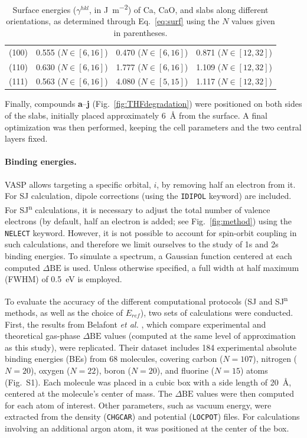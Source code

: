 \documentclass[journal=jpccck,manuscript=article]{achemso}
\def\dbe{\ensuremath{\Delta\text{BE}}}
\begin{document}
\begin{table}[!h]
	\centering
	\begin{tabular}{lccc}
		\toprule
		&	\ce{Ca^0} & \ce{CaO} &	\ce{CaH2} \\
		\midrule
		(100) & 0.555 ($N\in[6,16]$) & 0.470 ($N\in[6,16]$) & 0.871  ($N\in[12,32]$)\\
		(110) & 0.630  ($N\in[6,16]$)& 1.777  ($N\in[6,16]$)& 1.109 ($N\in[12,32]$)\\
		(111) & 0.563  ($N\in[6,16]$) & 4.080  ($N\in[5,15]$)  & 1.117   ($N\in[12,32]$) \\ 
		\bottomrule
	\end{tabular}
	\caption{Surface energies ($\gamma^{hkl}$, in \si{\joule\per\meter\squared}) of Ca, CaO, and  slabs along different orientations, as determined through Eq.~\eqref{eq:surf} using the $N$ values given in parentheses.}
	\label{tab:surf}
\end{table}

Finally, compounds \textbf{a}--\textbf{j} (Fig.~\ref{fig:THFdegradation}) were positioned on both sides of the slabs, initially placed approximately \SI{6}{\angstrom} from the surface. A final optimization was then performed, keeping the cell parameters and the two central layers fixed.

\paragraph{Binding energies.}  VASP allows targeting a specific orbital, $i$, by removing half an electron from it. For SJ calculation, dipole corrections (using the \texttt{IDIPOL} keyword) are included. For SJ\textsuperscript{n} calculations, it is necessary to adjust the total number of valence electrons (by default, half an electron is added; see Fig.~\ref{fig:method}) using the \texttt{NELECT} keyword. However, it is not possible to account for spin-orbit coupling in such calculations, and therefore we limit ourselves to the study of 1s and 2s binding energies. To simulate a spectrum, a Gaussian function centered at each computed \dbe{} is used. Unless otherwise specified, a full width at half maximum (FWHM) of \SI{0.5}{\electronvolt} is employed.

To evaluate the accuracy of the different computational protocols (SJ and SJ\textsuperscript{n} methods, as well as the choice of $E_{ref}$), two sets of calculations were conducted. First, the results from Belafont \textit{et al.} \cite{pueyobellafontPredictingCoreLevel2017}, which compare experimental and theoretical gas-phase \dbe{} values (computed at the same level of approximation as this study), were replicated. Their dataset includes 184 experimental absolute binding energies (BEs) from 68 molecules, covering carbon ($N=107$), nitrogen ($N=20$), oxygen ($N=22$), boron ($N=20$), and fluorine ($N=15$) atoms (Fig.~S1). Each molecule was placed in a cubic box with a side length of \SI{20}{\angstrom}, centered at the molecule's center of mass. The \dbe{} values were then computed for each atom of interest. Other parameters, such as vacuum energy, were extracted from the density (\texttt{CHGCAR}) and potential (\texttt{LOCPOT}) files. For calculations involving an additional argon atom, it was positioned at the center of the box.
\end{document}
